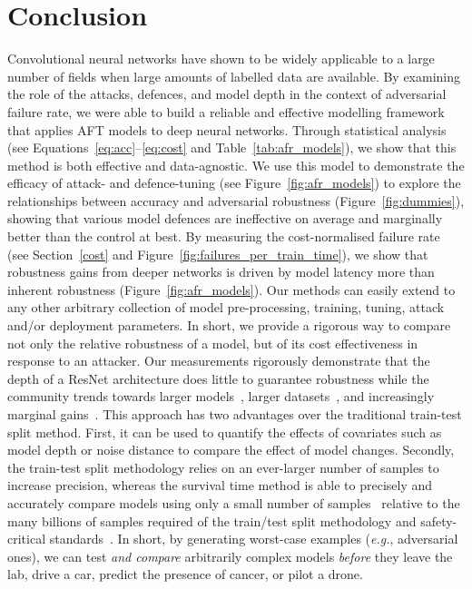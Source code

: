 
\section{Conclusion}
Convolutional neural networks have shown to be widely applicable to a large number of fields when large amounts of labelled data are available. By examining the role of the attacks, defences, and model depth in the context of adversarial failure rate, we were able to build a reliable and effective modelling framework that applies AFT models to deep neural networks. Through statistical analysis (see Equations~\ref{eq:acc}--\ref{eq:cost} and Table~\ref{tab:afr_models}), we show that this method is both effective and data-agnostic.  We use this model to demonstrate the efficacy of attack- and defence-tuning (see Figure~\ref{fig:afr_models}) to  explore the relationships between accuracy and adversarial robustness (Figure~\ref{fig:dummies}), showing that various model defences are ineffective on average and marginally better than the control at best.
By measuring the cost-normalised failure rate (see Section~\ref{cost} and Figure~\ref{fig:failures_per_train_time}), we show that robustness gains from deeper networks is driven by model latency more than inherent robustness (Figure~\ref{fig:afr_models}). Our methods can easily extend to any other arbitrary collection of model pre-processing, training, tuning, attack and/or deployment parameters. In short, we provide a rigorous way to compare not only the relative robustness of a model, but of its cost effectiveness in response to an attacker. Our measurements rigorously demonstrate  that the depth of a ResNet architecture does little to guarantee robustness while the community trends towards larger models~\cite{desislavov2021compute}, larger datasets~\cite{desislavov2021compute,bailly2022effects}, and increasingly marginal gains~\cite{sun2017revisiting}. This approach has two advantages over the traditional train-test split method. First, it can be used to quantify the effects of covariates such as model depth or noise distance to compare the effect of model changes. Secondly, the train-test split methodology relies on an ever-larger number of samples to increase precision, whereas the survival time method is able to precisely and accurately compare models using only a small number of samples~\cite{schmoor2000sample,lachin1981introduction} relative to the many billions of samples required of the train/test split methodology and safety-critical standards~\cite{iso26262,IEC61508,IEC62034,meyers}. 
In short, by generating worst-case examples (\textit{e.g.}, adversarial ones), we can test \textit{and compare} arbitrarily complex models \textit{before} they leave the lab, drive a car, predict the presence of cancer, or pilot a drone.
